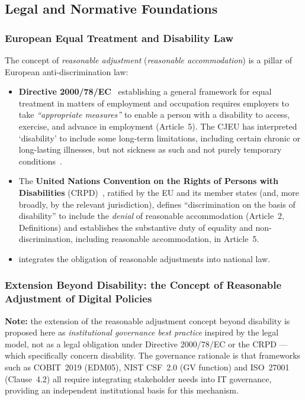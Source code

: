 \subsection{Legal and Normative Foundations}

\subsubsection{European Equal Treatment and Disability Law}

The concept of \emph{reasonable adjustment} (\emph{reasonable
accommodation}) is a pillar of European anti-discrimination law:

\begin{itemize}
    \item \textbf{Directive 2000/78/EC}~\cite{directive-2000-78} establishing
    a general framework for equal treatment in
    matters of employment and occupation requires employers to take
    \emph{``appropriate measures''} to enable a person with a disability
    to access, exercise, and advance in employment (Article~5). The
    CJEU has interpreted `disability' to include some long-term
    limitations, including certain chronic or long-lasting illnesses,
    but not sickness as such and not purely temporary
    conditions~\cite{cjue-chacon-navas, cjue-ring-skouboe}.

    \item The \textbf{United Nations Convention on the Rights of
    Persons with Disabilities} (CRPD)~\cite{un-crpd}, ratified by the EU and
    its member states (and, more broadly, by the relevant jurisdiction),
    defines ``discrimination on the basis of disability''
    to include the \emph{denial} of reasonable accommodation (Article~2,
    Definitions) and establishes the substantive duty of equality and
    non-discrimination, including reasonable accommodation, in
    Article~5.

    \item \textbf{}
    integrates the obligation of
    reasonable adjustments into national law.
\end{itemize}

\subsubsection{Extension Beyond Disability: the Concept of Reasonable Adjustment of Digital Policies}

\textbf{Note:} the extension of the reasonable adjustment concept
beyond disability is proposed here as \emph{institutional governance
best practice} inspired by the legal model, not as a legal obligation
under Directive 2000/78/EC or the CRPD --- which specifically concern
disability. The governance rationale is that frameworks such as
COBIT~2019 (EDM05), NIST CSF~2.0 (GV function) and ISO~27001
(Clause~4.2) all require integrating stakeholder needs into IT
governance, providing an independent institutional basis for this
mechanism.

